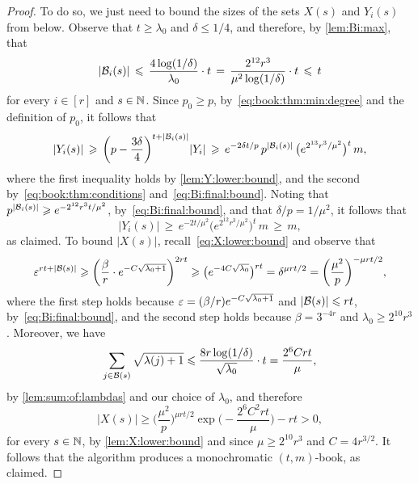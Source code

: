 \begin{proof}
  To do so, we just need to bound the sizes of the sets \(X(s)\) and \(Y_i(s)\) from below. Observe that \(t \ge \lambda_0\) and \(\delta \le 1/4\), and therefore, by \autoref{lem:Bi:max}, that
  \begin{equation}\label{eq:Bi:final:bound}
    |\mathcal{B}_i(s)| \, \leqslant \, \frac{4 \log(1/\delta)}{\lambda_0} \cdot t \, = \, \frac{2^{12} r^3}{\mu^2 \log(1/\delta)} \cdot t \, \leqslant \, t
  \end{equation}
  for every \(i \in [r]\) and \(s \in \mathbb{N}\). Since \(p_0 \ge p\), by~\eqref{eq:book:thm:min:degree} and the definition of \(p_0\), it follows that  
  \begin{equation*}
    |Y_i(s)| \, \geqslant \, \bigg( p - \frac{3\delta}{4} \bigg)^{t + |\mathcal{B}_i(s)|} |Y_i| \, \geqslant \, e^{-2\delta t / p} \, p^{|\mathcal{B}_i(s)|} \, \big( e^{2^{13} r^3 / \mu^2} \big)^t \, m,
  \end{equation*}
  where the first inequality holds by \autoref{lem:Y:lower:bound}, and the second by~\eqref{eq:book:thm:conditions} and~\eqref{eq:Bi:final:bound}. Noting that \(p^{|\mathcal{B}_i(s)|} \geqslant e^{-2^{12} r^3 t / \mu^2}\), by~\eqref{eq:Bi:final:bound}, and that \(\delta / p = 1/\mu^2\), it follows that 
  \begin{equation*}
    |Y_i(s)| \, \ge \, e^{-2 t / \mu^2} \big( e^{2^{12} r^3 / \mu^2} \big)^t \, m \, \ge \, m,
  \end{equation*}
  as claimed. To bound \(|X(s)|\), recall~\eqref{eq:X:lower:bound} and observe that 
  \begin{equation*}
    \varepsilon^{rt + |\mathcal{B}(s)|}  \geqslant \bigg( \frac{\beta}{r} \cdot e^{- C \sqrt{\lambda_0 + 1}} \bigg)^{2rt} \geqslant \big( e^{- 4C \sqrt{\lambda_0}} \big)^{rt} = \delta^{\mu r t/2} = \bigg( \frac{\mu^2}{p} \bigg)^{-\mu r t / 2},
  \end{equation*}
  where the first step holds because \(\varepsilon = (\beta / r) e^{- C \sqrt{\lambda_0 + 1}}\) and \(|\mathcal{B}(s)| \leqslant rt\), by~\eqref{eq:Bi:final:bound}, and the second step holds because \(\beta = 3^{-4r}\) and \(\lambda_0 \ge 2^{10} r^3\). Moreover, we have
  \begin{equation*}
    \sum_{j \in \mathcal{B}(s)} \sqrt{\lambda(j)+1} \leqslant \frac{8r \log(1/\delta)}{\sqrt{\lambda_0}} \cdot t = \frac{2^6Crt}{\mu},
  \end{equation*}
  by \autoref{lem:sum:of:lambdas} and our choice of \(\lambda_0\), and therefore 
  \begin{equation*}
    |X(s)| \ge \bigg( \frac{\mu^2}{p} \bigg)^{\mu r t / 2} \exp\bigg( - \frac{2^6C^2rt}{\mu} \bigg) - rt > 0,
  \end{equation*}
  for every \(s \in \mathbb{N}\), by \autoref{lem:X:lower:bound} and since \(\mu \ge 2^{10} r^3\) and \(C = 4r^{3/2}\). It follows that the algorithm produces a monochromatic \((t,m)\)-book, as claimed. 
\end{proof}
